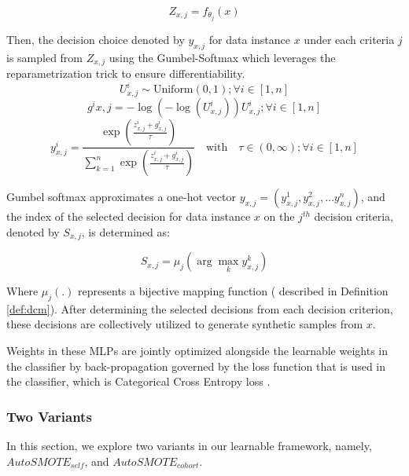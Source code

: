 \begin{equation}
    Z_{x,j} = f_{{\theta}_j}(x) 
\end{equation}

Then, the decision choice denoted by $y_{x,j}$ for
data instance $x$ under each criteria $j$ is sampled from $Z_{x,j}$ using the Gumbel-Softmax \cite{jang2017categorical}  which leverages the reparametrization trick to ensure differentiability. 
\begin{equation}
    U^i_{x,j} \sim \text{Uniform}(0, 1) ; \forall i \in [1, n]
\end{equation}
\begin{equation}
   g^i{x,j} = -\log(-\log(U^i_{x,j}))  U^i_{x,j} ; \forall i \in [1, n]
\end{equation}
\begin{equation}
    y^i_{x,j} = \frac{\exp\left(\frac{z^i_{x,j} + g^i_{x,j}}{\tau}\right)}{\sum_{k=1}^{n} \exp\left(\frac{z^i_{x,j} + g^i_{x,j}}{\tau}\right)} \quad \text{with} \quad \tau \in (0, \infty) ; \forall i \in [1, n]
\end{equation}

Gumbel softmax approximates a one-hot vector $y_{x,j} = (y^1_{x,j}, y^2_{x,j}, \dots y^n_{x,j})$, and the index of the selected decision for data instance $x$ on the $j^{th}$ decision criteria, denoted by $S_{x, j}$, is determined as:

\begin{equation}
    S_{x, j} = \mu_j(\arg\max_k y^k_{x,j})
\end{equation}

Where $\mu_j(.)$ represents a bijective mapping function ( described in Definition \ref{def:dcm}). After determining the selected decisions from each decision criterion, these decisions are collectively utilized to generate synthetic samples from 
$x$.

Weights in these MLPs  are jointly optimized alongside the learnable weights in the classifier by back-propagation governed by the loss function that is used in the classifier, which is Categorical Cross Entropy loss \cite{chahkoutahi2024influence}. 

\subsubsection{Two Variants}

In this section, we explore two variants in our  learnable framework, namely, $AutoSMOTE_{self}$, and $AutoSMOTE_{cohort}$. 

